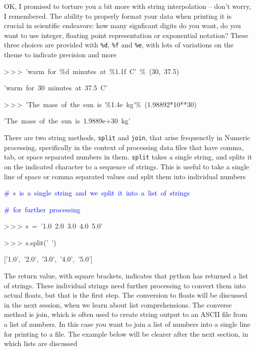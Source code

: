 OK, I promised to torture you a bit more with string interpolation
-- don't worry, I remembered. The ability to properly format your
data when printing it is crucial in scientific endeavors: how many
signficant digits do you want, do you want to use integer, floating
point representation or exponential notation? These three choices
are provided with \texttt{\%d}, \texttt{\%f} and \texttt{\%e}, with
lots of variations on the theme to indicate precision and more

\begin{lyxcode}
>\,{}>\,{}>~'warm~for~\%d~minutes~at~\%1.1f~C'~\%~(30,~37.5)

'warm~for~30~minutes~at~37.5~C'



>\,{}>\,{}>~'The~mass~of~the~sun~is~\%1.4e~kg'\%~(1.98892{*}10{*}{*}30)

'The~mass~of~the~sun~is~1.9889e+30~kg'


\end{lyxcode}
There are two string methods, \texttt{split} and \texttt{join}, that
arise frequenctly in Numeric processing, specifically in the context
of processing data files that have comma, tab, or space separated
numbers in them. \texttt{split} takes a single string, and splits
it on the indicated character to a sequence of strings. This is useful
to take a single line of space or comma separated values and split
them into individual numbers

\begin{lyxcode}
\textcolor{blue}{\#~s~is~a~single~string~and~we~split~it~into~a~list~of~strings}

\textcolor{blue}{\#~for~further~processing}

>\,{}>\,{}>~s~=~'1.0~2.0~3.0~4.0~5.0'

>\,{}>\,{}>~s.split('~')

{[}'1.0',~'2.0',~'3.0',~'4.0',~'5.0']
\end{lyxcode}
The return value, with square brackets, indicates that python has
returned a list of strings. These individual strings need further
processing to convert them into actual floats, but that is the first
step.  The conversion to floats will be discussed in the next session,
when we learn about list comprehensions. The converse method is join,
which is often used to create string output to an ASCII file from
a list of numbers. In this case you want to join a list of numbers
into a single line for printing to a file. The example below will
be clearer after the next section, in which lists are discussed

